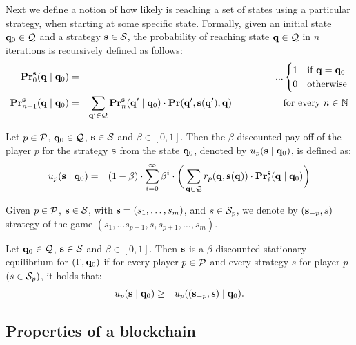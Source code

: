 Next we define a notion of how likely is reaching a set of states using a particular strategy, when starting at some specific state.
Formally, given an initial state $\mathbf{q}_0 \in \mathcal{Q}$ and a strategy $\mathbf{s} \in \mathcal{S}$, 
the probability of reaching state $\mathbf{q} \in \mathcal{Q}$ in $n$ iterations is recursively defined as follows:
\begin{eqnarray*}
\mathbf{Pr}_0^{\mathbf{s}}(\mathbf{q} \mid \mathbf{q}_0) & = &...
\begin{cases}
1 & \text{if } \mathbf{q} = \mathbf{q}_0\\
0 & \text{otherwise}
\end{cases}\\
\mathbf{Pr}_{n+1}^{\mathbf{s}}(\mathbf{q} \mid \mathbf{q}_0) & = & \sum_{\mathbf{q}' \in \mathcal{Q}} \mathbf{Pr}_n^{\mathbf{s}}(\mathbf{q}'\mid \mathbf{q}_0) \cdot \mathbf{Pr}(\mathbf{q}', \mathbf{s}(\mathbf{q}'), \mathbf{q}) \quad \quad \quad  \quad \quad \text{ for every } n \in \mathbb{N}
\end{eqnarray*}


\begin{mydef}
Let $p \in \mathcal{P}$, $\mathbf{q}_0 \in \mathcal{Q}$, $\mathbf{s} \in \mathcal{S}$ and $\beta \in [0,1]$. Then the $\beta$ discounted pay-off of the player $p$ for the strategy $\mathbf{s}$ from the state $\mathbf{q}_0$, denoted by $u_p(\mathbf{s} \mid \mathbf{q}_0)$, is defined as:
\begin{eqnarray*}
u_p(\mathbf{s} \mid \mathbf{q}_0) & = & (1 - \beta) \cdot \sum_{i=0}^{\infty}\beta^{i} \cdot  \bigg(\sum_{\mathbf{q} \in \mathcal{Q}} r_p(\mathbf{q},\mathbf{s}(\mathbf{q})) \cdot 
\mathbf{Pr}_i^{\mathbf{s}}(\mathbf{q} \mid \mathbf{q}_0)\bigg)
\end{eqnarray*}
\end{mydef}


Given $p \in \mathcal{P}$, $\mathbf{s} \in \mathcal{S}$, with $\mathbf{s} = (s_1, \ldots, s_m)$, and $s \in \mathcal{S}_p$, we denote by $(\mathbf{s}_{-p}, s)$ strategy of the game $(s_1, \ldots s_{p-1},s,s_{p+1}, \ldots, s_{m})$.
\begin{mydef}
Let $\mathbf{q}_0 \in \mathcal{Q}$, $\mathbf{s} \in \mathcal{S}$ and $\beta \in [0,1]$. Then $\mathbf{s}$ is a $\beta$ discounted stationary equilibrium for $(\Gamma, \mathbf{q}_0)$ if for every player $p \in \mathcal{P}$ and every strategy $s$ for player $p$ $(s \in\mathcal{S}_p)$, it holds that:
\begin{eqnarray*}
u_p(\mathbf{s} \mid \mathbf{q}_0)  & \geq  & u_p ((\mathbf{s}_{-p},s) \mid \mathbf{q}_0).
\end{eqnarray*}
\end{mydef}

\subsection{Properties of a blockchain}

